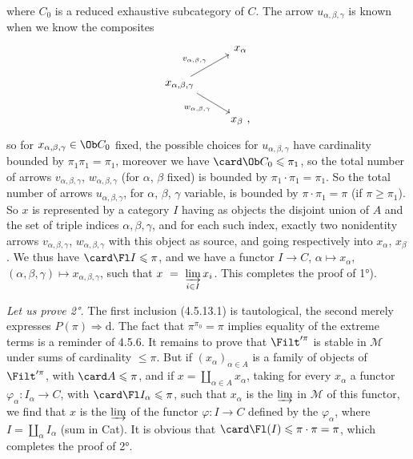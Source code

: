 where $C_0$ is a reduced exhaustive subcategory of $C$. The arrow $u_{\alpha,\beta,\gamma}$ is known when we know the composites
\[
\begin{tikzcd}
& x_{\alpha} \\
x_{\alpha,\beta,\gamma} \arrow[ur, "v_{\alpha,\beta,\gamma}"] \arrow[dr, "w_{\alpha,\beta,\gamma}"'] & \\
& x_{\beta} \text{ ,}
\end{tikzcd}
\]
so for $x_{\alpha,\beta,\gamma} \in \Ob C_0$ fixed, the possible choices for $u_{\alpha,\beta,\gamma}$ have cardinality bounded by $\pi_1\pi_1 = \pi_1$, moreover we have $\card \Ob C_0 \leqslant \pi_1$, so the total number of arrows $v_{\alpha,\beta,\gamma}$, $w_{\alpha,\beta,\gamma}$ (for $\alpha$, $\beta$ fixed) is bounded by $\pi_1 \cdot \pi_1 = \pi_1$. So the total number of arrows $u_{\alpha,\beta,\gamma}$, for $\alpha$, $\beta$, $\gamma$ variable, is bounded by $\pi \cdot \pi_1 = \pi$ (if $\pi \geqslant \pi_1$). So $x$ is represented by a category $I$ having as objects the disjoint union of $A$ and the set of triple indices $\alpha,\beta,\gamma$, and for each such index, exactly two nonidentity arrows $v_{\alpha,\beta,\gamma}$, $w_{\alpha,\beta,\gamma}$ with this object as source, and going respectively into $x_{\alpha}$, $x_{\beta}$. We thus have $\card \Fl I \leqslant \pi$, and we have a functor $I \longrightarrow C$, $\alpha \longmapsto x_{\alpha}$, $(\alpha,\beta,\gamma) \longmapsto x_{\alpha,\beta,\gamma}$, such that $x \ = \ \varinjlim\limits_{i\in I} x_i$. This completes the proof of 1°).

\textit{Let us prove 2°.} The first inclusion (4.5.13.1) is tautological, the second merely expresses $P(\pi) \Longrightarrow \mathrm{d}$. The fact that $\pi^{\pi_0} = \pi$ implies equality of the extreme terms is a reminder of 4.5.6. It remains to prove that $\Filt'^{\pi}$ is stable in $\mathcal{M}$ under sums of cardinality $\leqslant \pi$. But if $(x_{\alpha})_{\alpha\in A}$ is a family of objects of $\Filt'^{\pi}$, with $\card A \leqslant \pi$, and if $x = \coprod_{\alpha\in A} x_{\alpha}$, taking for every $x_{\alpha}$ a functor $\varphi_{\alpha} : I_{\alpha} \longrightarrow C$, with $\card \Fl I_{\alpha} \leqslant \pi$, such that $x_{\alpha}$ is the $\varinjlim$ in $\mathcal{M}$ of this functor, we find that $x$ is the $\varinjlim$ of the functor $\varphi : I \longrightarrow C$ defined by the $\varphi_{\alpha}$, where $I = \coprod_{\alpha} I_{\alpha}$ (sum in Cat). It is obvious that $\card \Fl(I) \leqslant \pi\cdot\pi = \pi$, which completes the proof of 2°.

